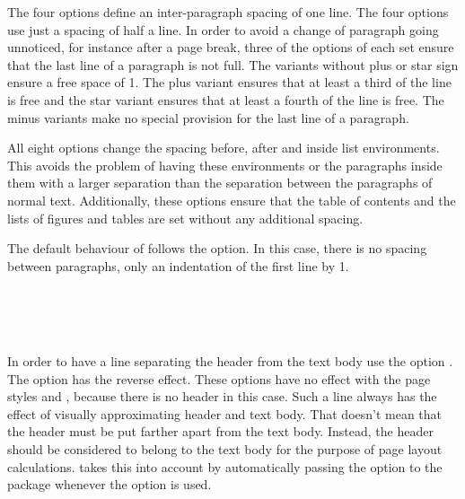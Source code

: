 The four  options define an inter-paragraph spacing of
one line. The four  options use just a spacing of
half a line.  In order to avoid a change of paragraph going unnoticed,
for instance after a page break, three of the options of each set
ensure that the last line of a paragraph is not full. The variants
without plus or star sign ensure a free space of 1. The plus
variant ensures that at least a third of the line is free and the star
variant ensures that at least a fourth of the line is free. The minus
variants make no special provision for the last line of a paragraph.

All eight options change the spacing before, after and inside list
environments. This avoids the problem of having these environments or
the paragraphs inside them with a larger separation than the
separation between the paragraphs of normal text. Additionally, these
options ensure that the table of contents and the lists of figures and
tables are set without any additional spacing.

The default behaviour of \KOMAScript{} follows the 
option.  In this case, there is no spacing between paragraphs, only an
indentation of the first line by 1.
%
%
%
%
%
%
%
%
%
%

\begin{Declaration}
  \\
  \\
  \\
\end{Declaration}%
%
%
%
%
In order to have a line separating the header from the text body use
the option . The option  has
the reverse effect. These options have no effect with the page styles
 and , because there is no header in this
case. Such a line always has the effect of visually approximating
header and text body. That doesn't mean that the header must be put
farther apart from the text body. Instead, the header should be
considered to belong to the text body for the purpose of page layout
calculations. {\KOMAScript} takes this into account by automatically
passing the option  to the 
package whenever the  option is used.

